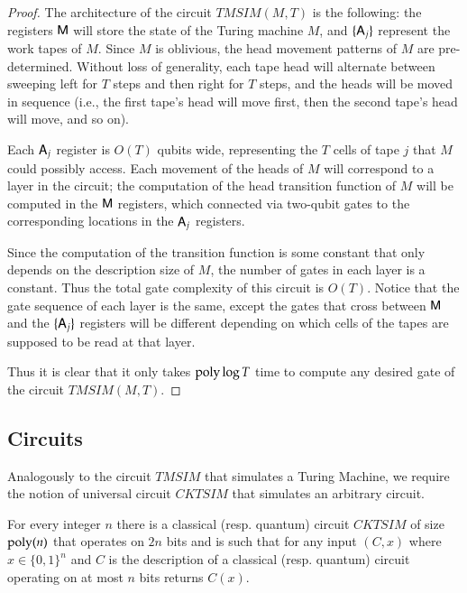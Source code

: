 \begin{proof}
	The architecture of the circuit $TMSIM(M,T)$ is the following: the registers ${\mathsf{M}}$ will store the state of the Turing machine $M$, and $\{{\mathsf{A}}_j\}$ represent the work tapes of $M$. Since $M$ is oblivious, the head movement patterns of $M$ are pre-determined. Without loss of generality, each tape head will alternate between sweeping left for $T$ steps and then right for $T$ steps, and the heads will be moved in sequence (i.e., the first tape's head will move first, then the second tape's head will move, and so on). 
	
	Each ${\mathsf{A}}_j$ register is $O(T)$ qubits wide, representing the $T$ cells of tape $j$ that $M$ could possibly access. Each movement of the heads of $M$ will correspond to a layer in the circuit; the computation of the head transition function of $M$ will be computed in the ${\mathsf{M}}$ registers, which connected via two-qubit gates to the corresponding locations in the ${\mathsf{A}}_j$ registers. 
	
	Since the computation of the transition function is some constant that only depends on the description size of $M$, the number of gates in each layer is a constant. Thus the total gate complexity of this circuit is $O(T)$. Notice that the gate sequence of each layer is the same, except the gates that cross between ${\mathsf{M}}$ and the $\{{\mathsf{A}}_j\}$ registers will be different depending on which cells of the tapes are supposed to be read at that layer. 
	
	Thus it is clear that it only takes $\operatorname{poly}\log T$ time to compute any desired gate of the circuit $TMSIM(M,T)$.
\end{proof}

\subsection{Circuits}

Analogously to the circuit $TMSIM$ that simulates a Turing Machine, we require the notion of universal circuit $CKTSIM$ that simulates an arbitrary circuit. 

\begin{lemma}\label{lem:cktsim}
For every integer $n$ there is a classical (resp. quantum) circuit $CKTSIM$ of size $\operatorname{poly}(n)$ that operates on $2n$ bits and is such that for any input $(C,x)$ where $x\in\{0,1\}^n$ and $C$ is the description of a classical (resp. quantum) circuit operating on at most $n$ bits returns $C(x)$. 
\end{lemma}

